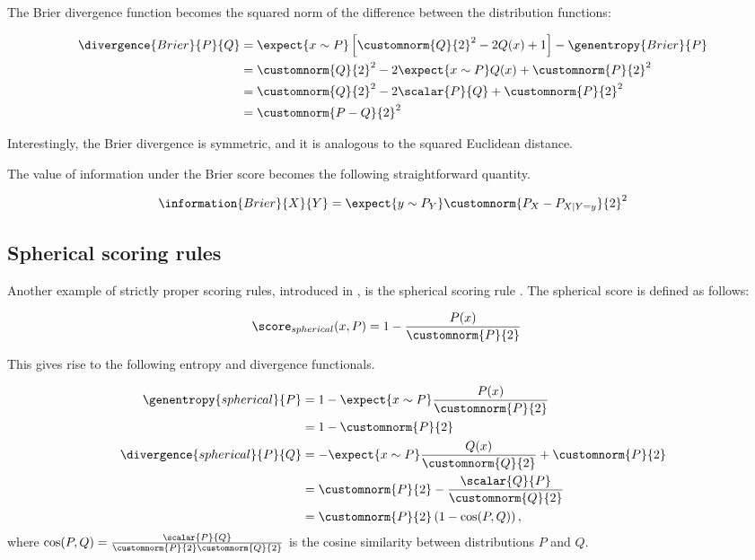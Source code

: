 The Brier divergence function becomes the squared norm of the difference between the distribution functions:

\begin{align}
	\divergence{Brier}{P}{Q} &= \expect{x \sim P}\left[\customnorm{Q}{2}^2 - 2Q(x) + 1\right] - \genentropy{Brier}{P} \\
		&= \customnorm{Q}{2}^2 -2 \expect{x \sim P} Q(x) + \customnorm{P}{2}^2 \\
		&= \customnorm{Q}{2}^2 - 2\scalar{P}{Q} + \customnorm{P}{2}^2\\
		&= \customnorm{P-Q}{2}^2
\end{align}

Interestingly, the Brier divergence is symmetric, and it is analogous to the squared Euclidean distance.

The value of information under the Brier score becomes the following straightforward quantity.

\begin{align}
	\information{Brier}{X}{Y} &= \expect{y \sim P_{Y}} \customnorm{P_X - P_{X\vert Y=y}}{2}^2\\
\end{align}

\subsection{Spherical scoring rules}
Another example of strictly proper scoring rules, introduced in \citep{Good1971}, is the spherical scoring rule \citep{Dawid2007,Dawid2012}. The spherical score is defined as follows:

\begin{align}
	\score_{spherical}(x,P) &= 1 -\frac{P(x)}{\customnorm{P}{2}}
\end{align}

This gives rise to the following entropy and divergence functionals.

\begin{align}
	\genentropy{spherical}{P} &= 1 -\expect{x \sim P}\frac{P(x)}{\customnorm{P}{2}}\\
		&= 1 -\customnorm{P}{2} \\
	\divergence{spherical}{P}{Q} &= -\expect{x \sim P}\frac{Q(x)}{\customnorm{Q}{2}} + \customnorm{P}{2}\\
		&= \customnorm{P}{2} - \frac{\scalar{Q}{P}}{\customnorm{Q}{2}}\\
		&= \customnorm{P}{2}\left( 1 - \cos(P,Q) \right),
\end{align}
where $\cos(P,Q) = \frac{\scalar{P}{Q}}{\customnorm{P}{2}\customnorm{Q}{2}}$ is the cosine similarity between distributions $P$ and $Q$.

